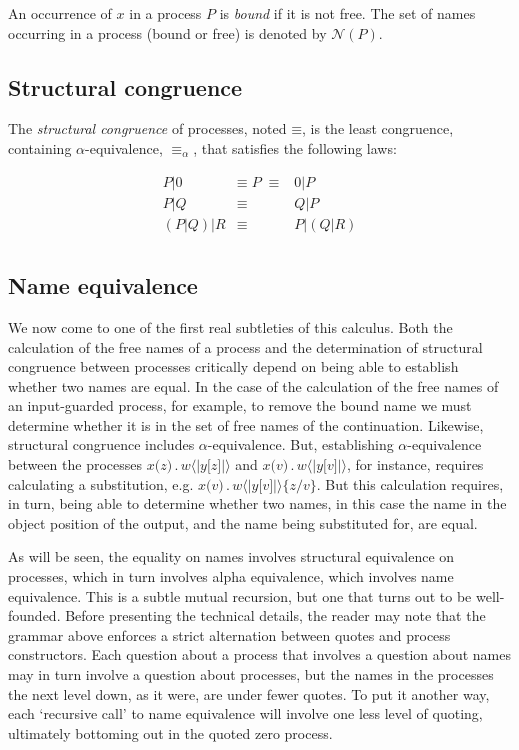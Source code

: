 \documentclass[]{amsart}
\newcommand{\lliftb}{\langle\!|}
\newcommand{\rliftb}{|\!\rangle}
\newcommand{\id}[1]{\texttt{#1}}
\newcommand{\pzero}{\mathbin{0}}
\newcommand{\juxtap}{\mathbin{\id{|}}}
\newcommand{\concat}{\mathbin{.}}
\newcommand{\scong}{\mathbin{\equiv}}
\newcommand{\alphaeq}{\mathbin{\equiv_{\alpha}}}
\newcommand{\names}[1]{\mathbin{\mathcal{N}(#1)}}
\newcommand{\lift}[2]{#1 \lliftb #2 \rliftb}
\theoremstyle{definition}
\theoremstyle{remark}
\numberwithin{equation}{subsection}
\begin{document}
An occurrence of $x$ in a process $P$ is \textit{bound} if it is not
free. The set of names occurring in a process (bound or free) is
denoted by $\names{P}$.

\subsection{Structural congruence}

The {\em structural congruence} of processes, noted $\scong$, is the
least congruence, containing $\alpha$-equivalence, $\alphaeq$, that
satisfies the following laws:

\begin{eqnarray*}
	{P} \juxtap \pzero	
		&  \scong \; {P} \; \scong & 
			\pzero \juxtap {P} \\
	{P} \juxtap {Q}	
		& \scong & 
			{Q} \juxtap {P} \\
	({P} \juxtap {Q}) \juxtap {R}
		& \scong & 
			{P} \juxtap ({Q} \juxtap {R}) \\
\end{eqnarray*}

\subsection{Name equivalence}

We now come to one of the first real subtleties of this calculus. Both
the calculation of the free names of a process and the determination
of structural congruence between processes critically depend on being
able to establish whether two names are equal. In the case of the
calculation of the free names of an input-guarded process, for
example, to remove the bound name we must determine whether it is in
the set of free names of the continuation. Likewise, structural
congruence includes $\alpha$-equivalence. But, establishing
$\alpha$-equivalence between the processes $x \id{(} z \id{)}\concat \lift{w}{y
\id{[}z\id{]}}$ and $x \id{(} v \id{)}\concat \lift{w}{y
\id{[}v\id{]}}$, for instance, requires calculating a substitution, e.g. $x \id{(} v \id{)}\concat \lift{w}{y
\id{[}v\id{]}} \id{\{}z / v \id{\}}$. But this calculation requires, in turn, being able to
determine whether two names, in this case the name in the object
position of the output, and the name being substituted for, are equal.

As will be seen, the equality on names involves structural equivalence
on processes, which in turn involves alpha equivalence, which involves
name equivalence. This is a subtle mutual recursion, but one that
turns out to be well-founded. Before presenting the technical details,
the reader may note that the grammar above enforces a strict
alternation between quotes and process constructors. Each question
about a process that involves a question about names may in turn
involve a question about processes, but the names in the processes the
next level down, as it were, are under fewer quotes. To put it another
way, each `recursive call' to name equivalence will involve one less
level of quoting, ultimately bottoming out in the quoted zero process.
\end{document}
